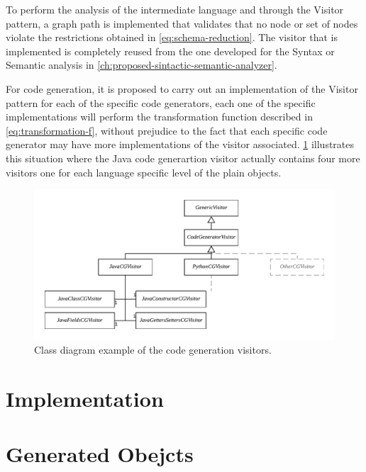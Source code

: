 To perform the analysis of the intermediate language and through the Visitor pattern,
a graph path is implemented that validates that no node or set of nodes
violate the restrictions obtained in \cref{eq:schema-reduction}. The visitor that is implemented is
completely reused from the one developed for the Syntax or Semantic analysis in \cref{ch:proposed-sintactic-semantic-analyzer}.

For code generation, it is proposed to carry out an implementation of the Visitor pattern for each of the specific code generators,
each one of the specific implementations will perform the transformation function described in \cref{eq:transformation-f},
without prejudice to the fact that each specific code generator may have more implementations of the visitor associated.
\cref{fig:class-diagram-cg} illustrates this situation where the Java code generartion visitor actually contains four more visitors
one for each language specific level of the plain objects.

\begin{figure}
    \includegraphics[width=\textwidth]{images/class-diagra-cg.pdf}
    \centering
	\caption[Class diagram example of the code generation visitors]{Class diagram example of the code generation visitors.}
    \label{fig:class-diagram-cg}
\end{figure}

\section{Implementation}

\section{Generated Obejcts}

